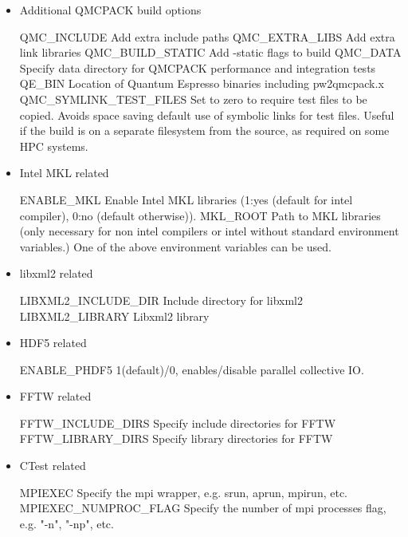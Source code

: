 \begin{itemize}
\item Additional QMCPACK build options

\begin{shade}
QMC_INCLUDE            Add extra include paths
QMC_EXTRA_LIBS         Add extra link libraries
QMC_BUILD_STATIC       Add -static flags to build
QMC_DATA               Specify data directory for QMCPACK performance and integration tests
QE_BIN                 Location of Quantum Espresso binaries including pw2qmcpack.x
QMC_SYMLINK_TEST_FILES Set to zero to require test files to be copied. Avoids space
                       saving default use of symbolic links for test files. Useful
                       if the build is on a separate filesystem from the source, as
                       required on some HPC systems.
\end{shade}

\item Intel MKL related
%
\begin{shade}
ENABLE_MKL          Enable Intel MKL libraries (1:yes (default for intel compiler),
                                                0:no (default otherwise)).
MKL_ROOT            Path to MKL libraries (only necessary for non intel compilers
                    or intel without standard environment variables.)
                    One of the above environment variables can be used.
\end{shade}

\item libxml2 related
%
\begin{shade}
LIBXML2_INCLUDE_DIR   Include directory for libxml2
LIBXML2_LIBRARY       Libxml2 library
\end{shade}

\item HDF5 related
%
\begin{shade}
ENABLE_PHDF5    1(default)/0, enables/disable parallel collective IO.
\end{shade}

\item FFTW related
%
\begin{shade}
FFTW_INCLUDE_DIRS   Specify include directories for FFTW
FFTW_LIBRARY_DIRS   Specify library directories for FFTW
\end{shade}

\item CTest related
%
\begin{shade}
MPIEXEC                Specify the mpi wrapper, e.g. srun, aprun, mpirun, etc.
MPIEXEC_NUMPROC_FLAG   Specify the number of mpi processes flag,
                       e.g. "-n", "-np", etc.
\end{shade}


\end{itemize}
